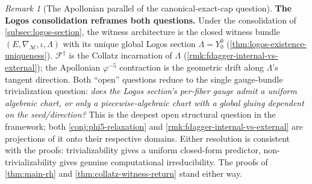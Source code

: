 \documentclass[11pt,a4paper]{article}
\theoremstyle{plain}
\theoremstyle{definition}
\theoremstyle{remark}
\newtheorem{remark}[theorem]{Remark}
\numberwithin{equation}{section}
\begin{document}
\begin{remark}[The Apollonian parallel of the canonical-exact-cap question]
\smallskip\noindent
\textbf{The Logos consolidation reframes both questions.}  Under
the consolidation of \cref{subsec:logos-section}, the witness
architecture is the closed witness bundle
$(E,\nabla_{\mathcal{M}},\iota,\Lambda)$ with its unique global
Logos section $\Lambda=Y_0^0$
(\cref{thm:logos-existence-uniqueness}).  $\mathcal{F}^{\dagger}$
is the Collatz incarnation of $\Lambda$
(\cref{rmk:fdagger-internal-vs-external}); the Apollonian
$\varphi^{-5}$ contraction is the geometric drift along
$\Lambda$'s tangent direction.  Both ``open'' questions reduce to
the single gauge-bundle trivialization question: \emph{does the
Logos section's per-fiber gauge admit a uniform algebraic chart, or
only a piecewise-algebraic chart with a global gluing dependent on
the seed/direction?}  This is the deepest open structural question
in the framework; both \cref{conj:phi5-relaxation} and
\cref{rmk:fdagger-internal-vs-external} are projections of it onto
their respective domains.  Either resolution is consistent with the
proofs: trivializability gives a uniform closed-form predictor,
non-trivializability gives genuine computational irreducibility.
The proofs of \cref{thm:main-rh} and
\cref{thm:collatz-witness-return} stand either way.
\end{remark}
\end{document}
